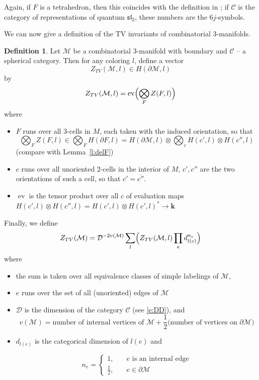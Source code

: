 \documentclass{amsart}
\theoremstyle{definition}
\newtheorem{definition}[theorem]{Definition}
\theoremstyle{remark}
\numberwithin{equation}{section}
\newcommand{\leref}[1]{Lemma~{\rm\ref{#1}}}
\newcommand{\ov}{\overline}
\newcommand{\del}{\partial}
\newcommand{\<}{\langle}
\renewcommand{\>}{\rangle}
\newcommand{\kk}{\mathbf{k}}       %
\newcommand{\DD}{\mathcal{D}}      %
\newcommand{\C}{\mathcal{C}}      %
\newcommand{\M}{\mathcal{M}}      %
\DeclareMathOperator{\ev}{ev} %
\begin{document}
Again, if $F$ is a tetrahedron, then this coincides with the definition in
; if $\C$ is the category of representations of
quantum $\mathfrak{sl}_2$, these numbers are the $6j$-symbols. 

We can now give a definition of the TV invariants of combinatorial
3-manifolds.

\begin{definition}\label{d:TV_invariant}
  Let $\M$ be a combinatorial 3-manifold with boundary and $\C$ -- a
  spherical category. Then for any coloring $l$, define a vector 
$$
Z_{TV}(\M,l)\in  H(\del \M,l)
$$
by 
$$
Z_{TV}(\M,l)=\ev\Bigl(\bigotimes_F Z(F,l)\Bigr)
$$
where 
\begin{itemize}
  \item $F$ runs over all 3-cells in $M$,   each taken with the induced
    orientation, so that  
    $$
      \bigotimes_F Z(F,l)\in \bigotimes_F H(\del F,l)=H(\del \M,l)\otimes
      \bigotimes_{c}  H(c',l)\otimes H(c'',l)
    $$
    (compare with \leref{l:delF})  

  \item $c$ runs over all unoriented 2-cells in
    the interior of   $M$, $c', c''$ are the two orientations of such a
    cell, so that   $c'=\ov{c''}$. 
  \item $\ev$ is the tensor product over all $c$ of evaluation maps
    $H(c',l)\otimes  H(c'',l)=H(c',l)\otimes H(c',l)^*\to \kk$
\end{itemize}

Finally, we define
$$
Z_{TV}(\M)=\DD^{-2v(\M)}\sum_{l} \Bigl(
Z_{TV}(\M,l)\prod_{e}d^{n_e}_{l(e)}\Bigr)
$$
where 
\begin{itemize}
\item the sum is taken over all equivalence classes of simple labelings
  of $\M$,
\item $e$ runs over the set of all (unoriented) edges of $\M$
\item $\DD$ is the dimension of the category $\C$ (see \eqref{e:DD}), and
$$
v(\M)=\text{number of internal vertices of } \M+\frac{1}{2}\text{(number of
vertices on }\del \M)
$$
\item $d_{l(e)}$ is the categorical dimension of $l(e)$ and 

$$n_e=\begin{cases}1, &\quad e \text{ is an internal edge}\\
                   \tfrac{1}{2}, &\quad e \in \del \M
                   \end{cases}
$$
\end{itemize}
\end{definition}
\end{document}
